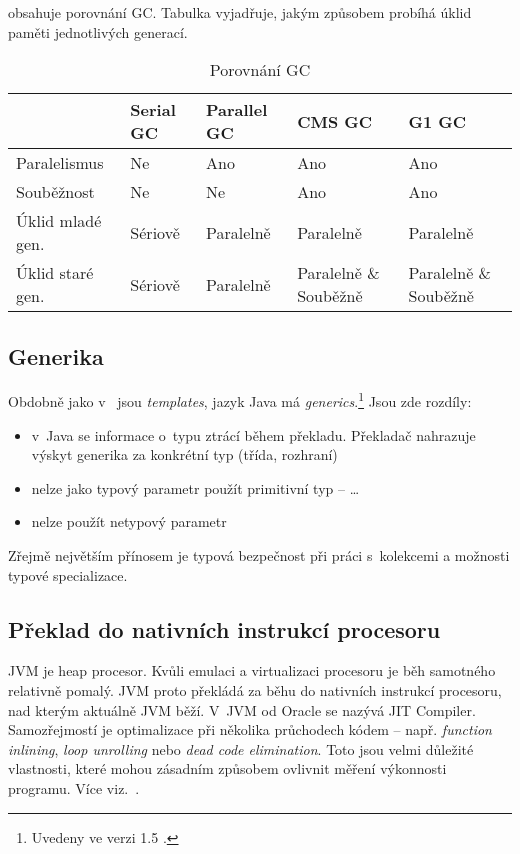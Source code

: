  obsahuje porovnání GC. Tabulka vyjadřuje, jakým způsobem probíhá úklid paměti jednotlivých generací.

\begin{table}
\center
\begin{tabular}{|l || l | l | p{2cm} | p{2cm} |}
\hline
& Serial GC & Parallel GC & CMS GC & G1 GC \\ \hline \hline
Paralelismus & Ne & Ano & Ano & Ano \\ \hline
Souběžnost & Ne & Ne & Ano & Ano \\ \hline
Úklid mladé gen. & Sériově & Paralelně & Paralelně & Paralelně \\ \hline
Úklid staré gen. & Sériově & Paralelně & Paralelně \& \mbox{Souběžně} & Paralelně \& \mbox{Souběžně} \\
 \hline
\end{tabular}
\caption{Porovnání GC\label{tab:gcs}}
\end{table}

\subsection{Generika\label{sub:generika}}

Obdobně jako v~\CC{} jsou \emph{templates}\cite{ISO:2012:CPP}, jazyk Java má \emph{generics}.\footnote{Uvedeny ve verzi 1.5 \cite{gosling2013java}.}
Jsou zde rozdíly:
\begin{itemize}
  \item v~Java se informace o~typu ztrácí během překladu. Překladač nahrazuje výskyt generika za konkrétní typ (třída, rozhraní)
  \item nelze jako typový parametr použít primitivní typ --  \ldots{}
  \item nelze použít netypový parametr
\end{itemize}

Zřejmě největším přínosem je typová bezpečnost při práci s~kolekcemi a možnosti typové specializace.

\subsection{Překlad \bytecode{} do nativních instrukcí procesoru}

JVM je heap procesor. Kvůli emulaci a virtualizaci procesoru je
běh samotného \bytecode{} relativně pomalý. JVM proto překládá
za běhu \bytecode{} do nativních instrukcí procesoru, nad kterým
aktuálně JVM běží. V~JVM od Oracle
 se nazývá JIT Compiler\cite{hunt2011java}. Samozřejmostí je optimalizace při několika průchodech
kódem -- např. \emph{function inlining}, \emph{loop unrolling} nebo \emph{dead code elimination}\cite{hunt2011java}. Toto jsou velmi důležité vlastnosti, které mohou zásadním způsobem
ovlivnit měření výkonnosti programu. Více viz.~.

